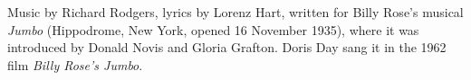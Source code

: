 \begin{notes}[History]
Music by Richard Rodgers, lyrics by Lorenz Hart, written for Billy Rose's
musical \emph{Jumbo} (Hippodrome, New York, opened 16 November 1935),
where it was introduced by Donald Novis and Gloria Grafton.
Doris Day sang it in the 1962 film \emph{Billy Rose's Jumbo}.
\end{notes}
